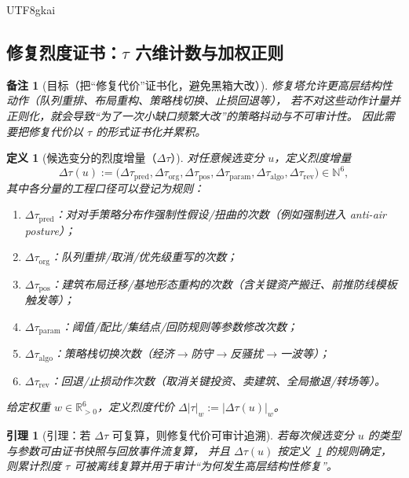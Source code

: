 \documentclass[12pt]{article}
\newtheorem{definition}{定义}[section]
\newtheorem{lemma}{引理}[section]
\newtheorem{remark}{备注}[section]
\newcommand{\RR}{\mathbb{R}}
\newcommand{\NN}{\mathbb{N}}
\begin{document}
\begin{CJK*}{UTF8}{gkai}
\subsection{修复烈度证书：$\tau$ 六维计数与加权正则}
\label{sec:openra-tau-certificate-implementation}

\begin{remark}[目标（把“修复代价”证书化，避免黑箱大改）]
修复塔允许更高层结构性动作（队列重排、布局重构、策略栈切换、止损回退等），
若不对这些动作计量并正则化，就会导致“为了一次小缺口频繁大改”的策略抖动与不可审计性。
因此需要把修复代价以 $\tau$ 的形式证书化并累积。
\end{remark}

\begin{definition}[候选变分的烈度增量（$\Delta\tau$）]
\label{def:openra-tau-increment}
对任意候选变分 $u$，定义烈度增量
\[
  \Delta\tau(u)
  :=
  \bigl(\Delta\tau_{\mathrm{pred}},\Delta\tau_{\mathrm{org}},\Delta\tau_{\mathrm{pos}},\Delta\tau_{\mathrm{param}},
    \Delta\tau_{\mathrm{algo}},\Delta\tau_{\mathrm{rev}}\bigr)\in\NN^6,
\]
其中各分量的工程口径可以登记为规则：
\begin{enumerate}
  \item $\Delta\tau_{\mathrm{pred}}$：对对手策略分布作强制性假设/扭曲的次数（例如强制进入 anti-air posture）；
  \item $\Delta\tau_{\mathrm{org}}$：队列重排/取消/优先级重写的次数；
  \item $\Delta\tau_{\mathrm{pos}}$：建筑布局迁移/基地形态重构的次数（含关键资产搬迁、前推防线模板触发等）；
  \item $\Delta\tau_{\mathrm{param}}$：阈值/配比/集结点/回防规则等参数修改次数；
  \item $\Delta\tau_{\mathrm{algo}}$：策略栈切换次数（经济$\to$防守$\to$反骚扰$\to$一波等）；
  \item $\Delta\tau_{\mathrm{rev}}$：回退/止损动作次数（取消关键投资、卖建筑、全局撤退/转场等）。
\end{enumerate}
给定权重 $w\in\RR_{>0}^6$，定义烈度代价 $\Delta|\tau|_w:=|\Delta\tau(u)|_w$。
\end{definition}

\begin{lemma}[引理：若 $\Delta\tau$ 可复算，则修复代价可审计追溯]
\label{lem:openra-tau-auditable}
若每次候选变分 $u$ 的类型与参数可由证书快照与回放事件流复算，
并且 $\Delta\tau(u)$ 按定义~\ref{def:openra-tau-increment} 的规则确定，
则累计烈度 $\tau$ 可被离线复算并用于审计“为何发生高层结构性修复”。
\end{lemma}


\end{CJK*}
\end{document}
